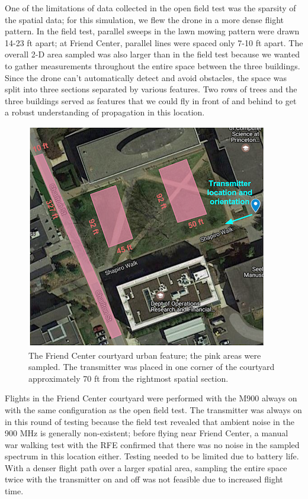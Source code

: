 \documentclass[pageno]{jpaper}
\begin{document}
One of the limitations of data collected in the open field test was the sparsity of the spatial data; for this simulation, we flew the drone in a more dense flight pattern. In the field test, parallel sweeps in the lawn mowing pattern were drawn 14-23 ft apart; at Friend Center, parallel lines were spaced only 7-10 ft apart. The overall 2-D area sampled was also larger than in the field test because we wanted to gather measurements throughout the entire space between the three buildings. Since the drone can't automatically detect and avoid obstacles, the space was split into three sections separated by various features. Two rows of trees and the three buildings served as features that we could fly in front of and behind to get a robust understanding of propagation in this location.

\begin{figure}
	\caption{The Friend Center courtyard urban feature; the pink areas were sampled. The transmitter was placed in one corner of the courtyard approximately 70 ft from the rightmost spatial section.}
	\centerline{\includegraphics{friend_1}}
\end{figure}

Flights in the Friend Center courtyard were performed with the M900 always on with the same configuration as the open field test. The transmitter was always on in this round of testing because the field test revealed that  ambient noise in the 900 MHz is generally non-existent; before flying near Friend Center, a manual war walking test with the RFE confirmed that there was no noise in the sampled spectrum in this location either. Testing needed to be limited due to battery life. With a denser flight path over a larger spatial area, sampling the entire space twice with the transmitter on and off was not feasible due to increased flight time.
\end{document}
